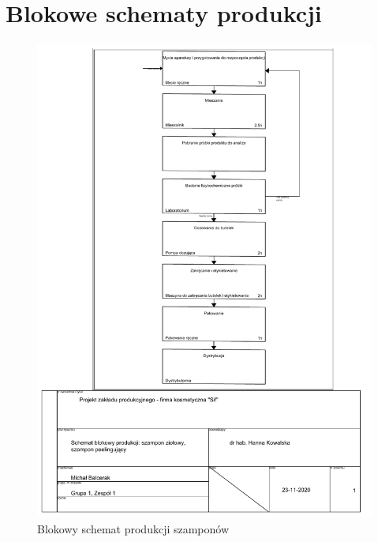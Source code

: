 \section{Blokowe schematy produkcji}

\begin{figure}[H]
	\centering
	\includegraphics[height=0.9\textheight]{./sec5/szampony.pdf}
	\caption{Blokowy schemat produkcji szamponów}
\end{figure}

